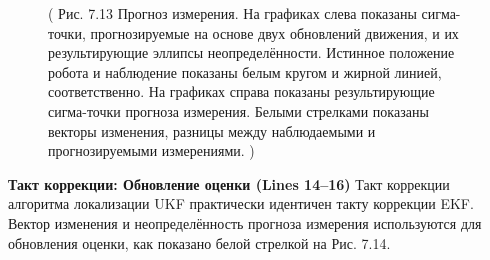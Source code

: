 \documentclass[10pt,a4paper]{article}
\begin{document}
\begin{figure}[H]
	\caption{ (  Рис. 7.13 Прогноз измерения. На графиках слева показаны сигма-точки, прогнозируемые на основе двух обновлений движения, и их результирующие эллипсы неопределённости. Истинное положение робота и наблюдение показаны белым кругом и жирной линией, соответственно. 
	На графиках справа показаны результирующие сигма-точки прогноза измерения. Белыми стрелками показаны векторы изменения, разницы между наблюдаемыми и прогнозируемыми измерениями.
		 )}
	\label{fig:713orig}
\end{figure}

\textbf{Такт коррекции: Обновление оценки (Lines 14–16)} Такт коррекции алгоритма локализации UKF практически идентичен такту коррекции EKF. Вектор изменения и неопределённость прогноза измерения используются для обновления оценки, как показано белой стрелкой на Рис. 7.14.\\
\end{document}
